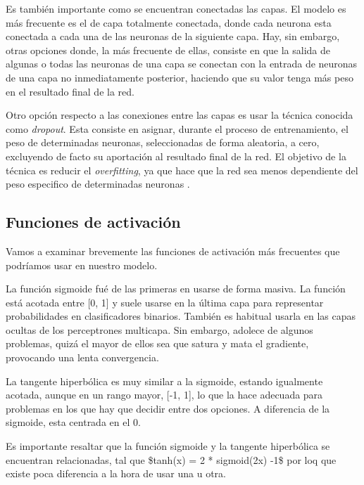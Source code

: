 Es también importante como se encuentran conectadas las capas. El modelo
es más frecuente es el de capa totalmente conectada, donde cada neurona
esta conectada a cada una de las neuronas de la siguiente capa. Hay, sin
embargo, otras opciones donde, la más frecuente de ellas, consiste en
que la salida de algunas o todas las neuronas de una capa se conectan
con la entrada de neuronas de una capa no inmediatamente posterior,
haciendo que su valor tenga más peso en el resultado final de la red.

Otro opción respecto a las conexiones entre las capas es usar la técnica
conocida como \emph{dropout}. Esta consiste en asignar, durante el
proceso de entrenamiento, el peso de determinadas neuronas,
seleccionadas de forma aleatoria, a cero, excluyendo de facto su
aportación al resultado final de la red. El objetivo de la técnica es
reducir el \emph{overfitting}, ya que hace que la red sea menos
dependiente del peso especifico de determinadas neuronas \cite{JMLR:v15:srivastava14a}.

\subsection{Funciones de activación}\label{funciones-de-activacion}

Vamos a examinar brevemente las funciones de activación más frecuentes
que podríamos usar en nuestro modelo.

La función sigmoide fué de las primeras en usarse de forma masiva. La
función está acotada entre {[}0, 1{]} y suele usarse en la última capa
para representar probabilidades en clasificadores binarios. También es
habitual usarla en las capas ocultas de los perceptrones multicapa. Sin
embargo, adolece de algunos problemas, quizá el mayor de ellos sea que
satura y mata el gradiente, provocando una lenta convergencia.

La tangente hiperbólica es muy similar a la sigmoide, estando igualmente
acotada, aunque en un rango mayor, {[}-1, 1{]}, lo que la hace adecuada
para problemas en los que hay que decidir entre dos opciones. A
diferencia de la sigmoide, esta centrada en el 0.

Es importante resaltar que la función sigmoide y la tangente hiperbólica
se encuentran relacionadas, tal que \$tanh(x) = 2 * sigmoid(2x) -1\$ por
loq que existe poca diferencia a la hora de usar una u otra.

